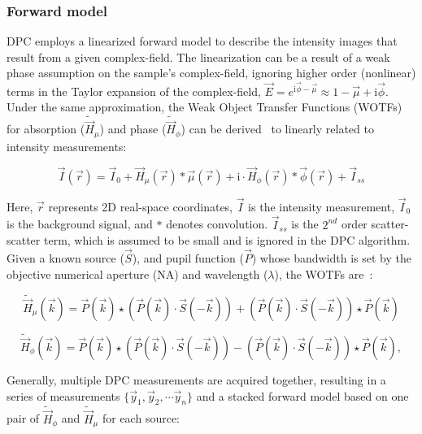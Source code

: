 \subsubsection{Forward model}
\label{sec:forward}
DPC employs a linearized forward model to describe the intensity images that result from a given complex-field. The linearization can be a result of a weak phase assumption on the sample's complex-field, ignoring higher order (nonlinear) terms in the Taylor expansion of the complex-field, $\vec{E} = e^{\mathrm{i}\vec{\phi} -\vec{\mu}} \approx 1 - \vec{\mu} + \mathrm{i}\vec{\phi}$.
Under the same approximation, the Weak Object Transfer Functions (WOTFs) for absorption ($\tilde{\vec{H}}_{\mu}$) and phase ($\tilde{\vec{H}}_{\phi}$) can be derived~\cite{Claus2015, tian2015quantitative, Hamilton1984a} to linearly related to intensity measurements:

\begin{equation}
	\vec{I}(\vec{r}) = \vec{I}_{0} +\vec{H}_{\mu}(\vec{r}) * \vec{\mu}(\vec{r}) + \mathrm{i}\cdot \vec{H}_{\phi}(\vec{r}) * \vec{\phi}(\vec{r}) + \vec{I}_{ss}
	\label{eq:wotf_2}
\end{equation}

\noindent Here, $\vec{r}$ represents 2D real-space coordinates, $\vec{I}$ is the intensity measurement, $\vec{I}_0$ is the background signal, and $*$ denotes convolution. $\vec{I}_{ss}$ is the $2^{nd}$ order scatter-scatter term, which is assumed to be small and is ignored in the DPC algorithm. Given a known source ($\vec{S}$), and pupil function ($\vec{P}$) whose bandwidth is set by the objective numerical aperture (NA) and wavelength ($\lambda$), the WOTFs are~\cite{Claus2015,tian2015quantitative}:

\begin{equation}\label{WOTF_re}
\tilde{\vec{H}}_{\mu}(\vec{k}) = \vec{P}(\vec{k}) \star (\vec{P}(\vec{k})\cdot \vec{S}(-\vec{k}))+ (\vec{P}(\vec{k}) \cdot \vec{S}(-\vec{k})) \star \vec{P}(\vec{k})
\end{equation}

\begin{equation}\label{WOTF_im}
\tilde{\vec{H}}_{\phi} (\vec{k}) = \vec{P}(\vec{k}) \star (\vec{P}(\vec{k})\cdot \vec{S}(-\vec{k}))- (\vec{P}(\vec{k}) \cdot \vec{S}(-\vec{k})) \star \vec{P}(\vec{k}),
\end{equation}

Generally, multiple DPC measurements are acquired together, resulting in a series of measurements $\{\vec{y}_1, \vec{y}_2, \cdots \vec{y}_n\}$ and a stacked forward model based on one pair of $\tilde{\vec{H}}_{\phi}$ and $\tilde{\vec{H}}_{\mu}$ for each source:

